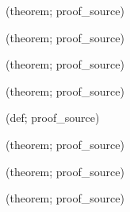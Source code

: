 \noindent{} {\scriptsize (theorem; proof\_source)}\par
\noindent{} {\scriptsize (theorem; proof\_source)}\par
\noindent{} {\scriptsize (theorem; proof\_source)}\par
\noindent{} {\scriptsize (theorem; proof\_source)}\par
\noindent{} {\scriptsize (def; proof\_source)}\par
\noindent{} {\scriptsize (theorem; proof\_source)}\par
\noindent{} {\scriptsize (theorem; proof\_source)}\par
\noindent{} {\scriptsize (theorem; proof\_source)}\par
\endgroup
